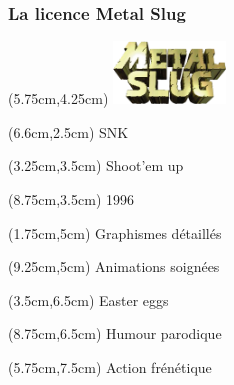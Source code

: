 \begin{frame}
	
	\frametitle{La licence Metal Slug}
	
	\begin{textblock*}{3cm}(5.75cm,4.25cm)
		\includegraphics[width=3cm]{figures/logo_metal_slug.png}
	\end{textblock*}
	
	
	{
		\begin{textblock*}{5cm}(6.6cm,2.5cm)
			SNK
		\end{textblock*}
		\begin{textblock*}{5cm}(3.25cm,3.5cm)
			Shoot'em up
		\end{textblock*}
		\begin{textblock*}{5cm}(8.75cm,3.5cm)
			1996
		\end{textblock*}
		\begin{textblock*}{5cm}(1.75cm,5cm)
			Graphismes détaillés
		\end{textblock*}
		\begin{textblock*}{5cm}(9.25cm,5cm)
			Animations soignées
		\end{textblock*}
		\begin{textblock*}{5cm}(3.5cm,6.5cm)
			Easter eggs
		\end{textblock*}
		\begin{textblock*}{5cm}(8.75cm,6.5cm)
			Humour parodique
		\end{textblock*}
		\begin{textblock*}{5cm}(5.75cm,7.5cm)
			Action frénétique
		\end{textblock*}
	}
\end{frame}
